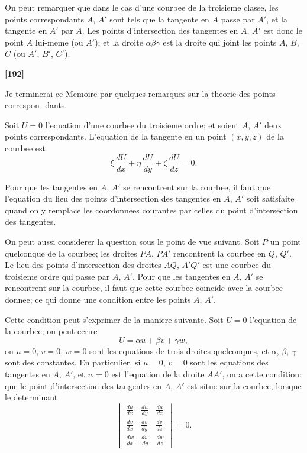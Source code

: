 \documentclass[11pt,a4paper]{book}
\begin{document}
On peut remarquer que dans le cas d'une courbee de la troisieme classe, les points
correspondants $A$, $A'$ sont tels que la tangente en $A$ passe par $A'$, et la tangente en
$A'$ par $A$. Les points d'intersection des tangentes en $A$, $A'$ est donc le point $A$ lui-meme
(ou $A'$); et la droite $\alpha\beta\gamma$ est la droite qui joint les points $A$, $B$, $C$ (ou $A'$, $B'$, $C'$).

\textbf{[192]}

Je terminerai ce Memoire par quelques remarques sur la theorie des points correspon-
dants.

Soit $U = 0$ l'equation d'une courbee du troisieme ordre; et soient $A$, $A'$ deux points
correspondants. L'equation de la tangente en un point $(x, y, z)$ de la courbee est
\[\xi\, \frac{dU}{dx} + \eta\, \frac{dU}{dy} + \zeta\, \frac{dU}{dz} = 0.\]

Pour que les tangentes en $A$, $A'$ se rencontrent sur la courbee, il faut que l'equation
du lieu des points d'intersection des tangentes en $A$, $A'$ soit satisfaite quand on y
remplace les coordonnees courantes par celles du point d'intersection des tangentes.

On peut aussi considerer la question sous le point de vue suivant. Soit $P$ un point
quelconque de la courbee; les droites $PA$, $PA'$ rencontrent la courbee en $Q$, $Q'$. Le lieu
des points d'intersection des droites $AQ$, $A'Q'$ est une courbee du troisieme ordre qui
passe par $A$, $A'$. Pour que les tangentes en $A$, $A'$ se rencontrent sur la courbee, il faut
que cette courbee coincide avec la courbee donnee; ce qui donne une condition entre
les points $A$, $A'$.

Cette condition peut s'exprimer de la maniere suivante. Soit $U = 0$ l'equation de
la courbee; on peut ecrire
\[U = \alpha u + \beta v + \gamma w,\]
ou $u = 0$, $v = 0$, $w = 0$ sont les equations de trois droites quelconques, et $\alpha$, $\beta$, $\gamma$ sont des
constantes. En particulier, si $u = 0$, $v = 0$ sont les equations des tangentes en $A$, $A'$,
et $w = 0$ est l'equation de la droite $AA'$, on a cette condition: que le point d'intersection
des tangentes en $A$, $A'$ est situe sur la courbee, lorsque le determinant
\[\begin{vmatrix}
\frac{du}{dx} & \frac{du}{dy} & \frac{du}{dz}\\
\frac{dv}{dx} & \frac{dv}{dy} & \frac{dv}{dz}\\
\frac{dw}{dx} & \frac{dw}{dy} & \frac{dw}{dz}
\end{vmatrix} = 0.\]
\end{document}
